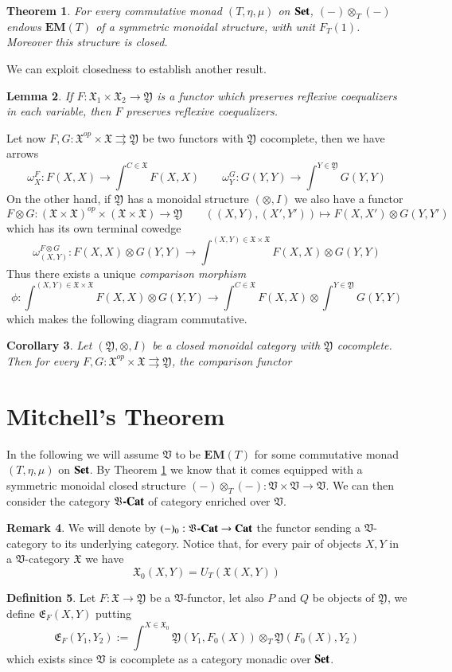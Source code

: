 \documentclass[12pt]{article}
\newtheorem{lemma}{Lemma}[section]
\newtheorem{theorem}[lemma]{Theorem}
\newtheorem{corollary}[lemma]{Corollary}
\theoremstyle{definition}
\newtheorem{definition}[lemma]{Definition}
\newtheorem{remark}[lemma]{Remark}
\def\X{\mathfrak X}
\def\V{\mathfrak V}
\def\Y{\mathfrak Y}
\newcommand{\Set}{\textbf{\textup{Set}}}
\newcommand{\Cat}{\textbf{\textup{Cat}}}
\newcommand{\eim}[1]{\mathbf{EM}{(#1)}}
\numberwithin{equation}{section}
\newcommand{\vcat}{\V\textbf{\textup{-Cat}}}
\def\e{\mathfrak{E}}
\begin{document}
	\begin{theorem}\label{thm:mon}
	For every commutative monad $(T, \eta, \mu)$ on $\Set$, $(-)\otimes_T(-)$ endows $\eim{T}$ of a symmetric monoidal structure, with unit $F_T(1)$. Moreover this structure is closed.
	\end{theorem}
	
	We can exploit closedness to establish another result. 
	
	\begin{lemma}
		If $F:\X_1\times \X_2\to \Y$ is a functor which preserves reflexive coequalizers in each variable, then $F$ preserves reflexive coequalizers.
	\end{lemma}

Let now $F, G:\X^{op}\times \X \rightrightarrows \Y$ be two functors with $\Y$ cocomplete, then we have arrows
\[\omega^F_X:F(X,X)\to \int^{C\in \X}F(X, X) \qquad \omega^G_Y: G(Y,Y)\to \int^{Y\in \Y} G(Y, Y) \]
On the other hand, if $\Y$ has a monoidal structure $(\otimes, I)$ we also have a functor
\[F\otimes G: (\X\times \X )^{op}\times (\X\times \X) \to \Y \qquad ((X, Y), (X', Y')) \mapsto F(X, X')\otimes G(Y, Y')\]
which has its own terminal cowedge
\[\omega^{F\otimes G}_{(X,Y)}: F(X, X)\otimes G(Y, Y) \to \int^{(X,Y)\in \X\times \X} F(X,X)\otimes G(Y,Y)\]
Thus there exists a unique \emph{comparison morphism}
\[\phi:\int^{(X,Y)\in \X\times \X} F(X,X)\otimes G(Y,Y) \to \int^{C\in \X}F(X, X) \otimes \int^{Y\in \Y} G(Y, Y)\]
which makes the following diagram commutative.

\begin{corollary}\label{cor:refcoeq}
	Let $(\Y, \otimes, I)$ be a closed monoidal category with $\Y$ cocomplete. Then for every $F, G:\X^{op}\times \X \rightrightarrows \Y$, the comparison functor 
\end{corollary}
	
	\section{Mitchell's  Theorem}
	In the following we will assume $\V$ to be $\eim{T}$ for some commutative monad $(T, \eta, \mu)$ on $\Set$. By Theorem \ref{thm:mon} we know that it comes equipped with a symmetric monoidal closed structure $(-)\otimes_T (-):\V\times \V\to \V$. We can then consider the category $\vcat$ of category enriched over $\V$.
	
	\begin{remark}We will denote by  $(-)_0:\vcat\to \Cat$ the functor sending a $\V$-category to its underlying category. Notice that, for every pair of objects $X, Y$  in a $\V$-category $\X$ we have
		\[\X_0(X,Y)=U_T(\X(X,Y))\]
	\end{remark}
	\begin{definition}
		Let $F:\X\to \Y$ be a $\V$-functor, let also $P$ and $Q$ be objects of $\Y$, we define $\e_F(X, Y) $ putting
		\[\e_F(Y_1, Y_2):=\int^{X\in \X_0} \Y(Y_1, F_0(X)) \otimes_T \Y(F_0(X), Y_2)\]
		which exists since $\V$ is cocomplete as a category monadic over $\Set$.
	\end{definition}
\end{document}
